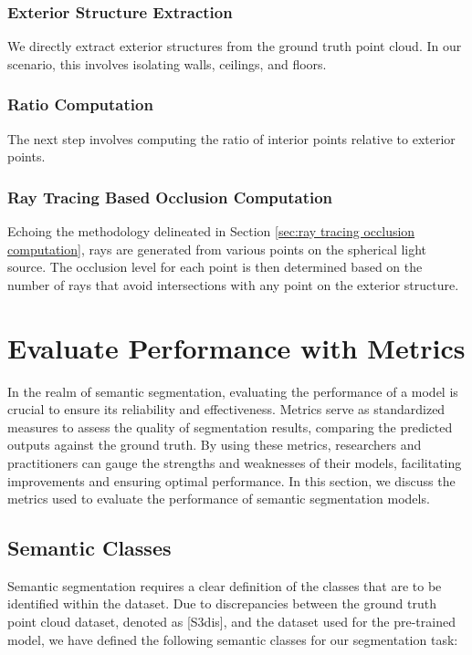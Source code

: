 \documentclass[11pt, a4paper,oneside,chapterprefix=false]{scrbook}
\begin{document}
\subsubsection{Exterior Structure Extraction}

We directly extract exterior structures from the ground truth point cloud. In our scenario, this involves isolating walls, ceilings, and floors.

\subsubsection{Ratio Computation}

The next step involves computing the ratio of interior points relative to exterior points.

\subsubsection{Ray Tracing Based Occlusion Computation}

Echoing the methodology delineated in Section \ref{sec:ray tracing occlusion computation}, rays are generated from various points on the spherical light source. The occlusion level for each point is then determined based on the number of rays that avoid intersections with any point on the exterior structure.


\section{Evaluate Performance with Metrics}

In the realm of semantic segmentation, evaluating the performance of a model is crucial to ensure its reliability and effectiveness. Metrics serve as standardized measures to assess the quality of segmentation results, comparing the predicted outputs against the ground truth. By using these metrics, researchers and practitioners can gauge the strengths and weaknesses of their models, facilitating improvements and ensuring optimal performance. In this section, we discuss the metrics used to evaluate the performance of semantic segmentation models.

\subsection{Semantic Classes}

Semantic segmentation requires a clear definition of the classes that are to be identified within the dataset. Due to discrepancies between the ground truth point cloud dataset, denoted as [S3dis], and the dataset used for the pre-trained model, we have defined the following semantic classes for our segmentation task:
\end{document}
